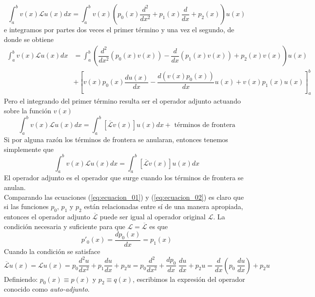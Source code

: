 \begin{equation}
\int_{a}^{b} v(x) \mathscr{L} u(x) dx = \int_{a}^{b} v(x) \left( p_{0}(x) \dfrac{d^{2}}{d x^{2}} + p_{1}(x) \dfrac{d}{dx} + p_{2}(x) \right) u(x)
\label{eq:ecuacion_03}
\end{equation}
e integramos por partes dos veces el primer término y una vez el segundo, de donde se obtiene
\[ \begin{split}
\int_{a}^{b} v(x) \mathscr{L} u(x) dx &= \int_{a}^{b} \left( \dfrac{d^{2}}{d x^{2}}(p_{0}(x) v(x)) - \dfrac{d}{dx} (p_{1}(x) v(x)) + p_{2}(x)v(x) \right) u(x) \\
&+ \left[ v(x) p_{0}(x) \dfrac{d u(x)}{dx} - \dfrac{d (v(x)p_{0}(x))}{dx} u(x) + v(x) p_{1}(x) u(x) \right]_{a}^{b}
\end{split} \]
Pero el integrando del primer término resulta ser el operador adjunto actuando sobre la función $v(x)$
\begin{equation}
\int_{a}^{b} v(x) \mathscr{L} u(x) dx = \int_{a}^{b} \left[ \overline{\mathscr{L}} v(x) \right] u(x)  dx + \text{ términos de frontera}
\label{eq:ecuacion_04}
\end{equation}
Si por alguna razón los términos de frontera se anularan, entonces tenemos simplemente que
\begin{equation}
\int_{a}^{b} v(x) \mathscr{L} u(x) dx = \int_{a}^{b} \left[ \overline{\mathscr{L}} v(x) \right] u(x)  dx 
\label{eq:ecuacion_05}
\end{equation}
El operador adjunto es el operador que surge cuando los términos de frontera se anulan.
\\
Comparando las ecuaciones (\ref{eq:ecuacion_01}) y (\ref{eq:ecuacion_02}) es claro que si las funciones $p_{0}$, $p_{1}$ y $p_{2}$ están relacionadas entre sí de una manera apropiada, entonces el operador adjunto $\overline{\mathscr{L}}$ puede ser igual al operador original $\mathscr{L}$. La condición necesaria y suficiente para que $\mathscr{L} = \overline{\mathscr{L}}$ es que
\begin{equation}
p'_{0}(x) = \dfrac{d p_{0}(x)}{dx} = p_{1}(x) \label{eq:ecuacion_06}
\end{equation}
Cuando la condición se satisface
\[ \overline{\mathscr{L}} u(x) = \mathscr{L} u(x) = p_{0} \dfrac{d^{2} u}{d x^{2}} + p_{1} \dfrac{d u}{dx} + p_{2} u = p_{0} \dfrac{d^{2}}{d x^{2}} + \dfrac{d p_{0}}{dx} \; \dfrac{d u}{dx} + p_{2} u = \dfrac{d}{dx} \left( p_{0} \; \dfrac{d u}{dx} \right) + p_{2} u \]
Definiendo: $p_{0}(x) \equiv p(x)$ y $p_{2} \equiv q(x)$, escribimos la expresión del operador conocido como \emph{auto-adjunto}.
